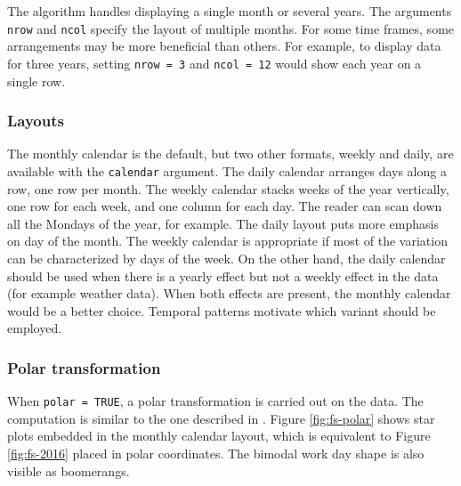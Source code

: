 \documentclass[12pt]{article}
\begin{document}
The algorithm handles displaying a single month or several years. The
arguments \texttt{nrow} and \texttt{ncol} specify the layout of multiple
months. For some time frames, some arrangements may be more beneficial
than others. For example, to display data for three years, setting
\texttt{nrow\ =\ 3} and \texttt{ncol\ =\ 12} would show each year on a
single row.

\hypertarget{layouts}{%
\subsubsection{Layouts}\label{layouts}}

The monthly calendar is the default, but two other formats, weekly and
daily, are available with the \texttt{calendar} argument. The daily
calendar arranges days along a row, one row per month. The weekly
calendar stacks weeks of the year vertically, one row for each week, and
one column for each day. The reader can scan down all the Mondays of the
year, for example. The daily layout puts more emphasis on day of the
month. The weekly calendar is appropriate if most of the variation can
be characterized by days of the week. On the other hand, the daily
calendar should be used when there is a yearly effect but not a weekly
effect in the data (for example weather data). When both effects are
present, the monthly calendar would be a better choice. Temporal
patterns motivate which variant should be employed.

\hypertarget{polar-transformation}{%
\subsubsection{Polar transformation}\label{polar-transformation}}

When \texttt{polar\ =\ TRUE}, a polar transformation is carried out on
the data. The computation is similar to the one described in
\citet{Wickham2012glyph}. Figure \ref{fig:fs-polar} shows star plots
embedded in the monthly calendar layout, which is equivalent to Figure
\ref{fig:fs-2016} placed in polar coordinates. The bimodal work day
shape is also visible as boomerangs.
\end{document}
